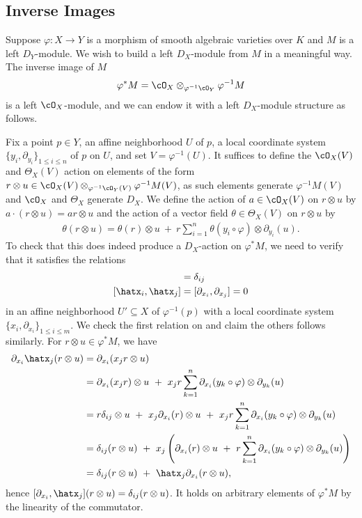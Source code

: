 \subsection{Inverse Images}
Suppose $\varphi:X\to Y$ is a morphism of smooth algebraic varieties over $K$ and $M$ is a left $D_Y$-module. We wish to build a left $D_X$-module from $M$ in a meaningful way. The inverse image of $M$
\begin{align*}
	\varphi^*M = \cO_X \otimes_{\varphi^{-1}\cO_Y} \varphi^{-1}M
\end{align*}
is a left $\cO_X$-module, and we can endow it with a left $D_X$-module structure as follows.

Fix a point $p \in Y$, an affine neighborhood $U$ of $p$, a local coordinate system $\{y_i,\partial_{y_i}\}_{1\leq i\leq n}$ of $p$ on $U$, and set $V = \varphi^{-1}(U)$. It suffices to define the $\cO_X(V)$ and $\Theta_X(V)$ action on elements of the form $r \otimes u \in \cO_X(V) \otimes_{\varphi^{-1}\cO_Y(V)} \varphi^{-1}M(V)$, as such elements generate $\varphi^{-1}M(V)$ and $\cO_X$ and $\Theta_X$ generate $D_X$. We define the action of $a \in \cO_X(V)$ on $r\otimes u$ by $a\cdot (r\otimes u) = ar\otimes u$ and the action of a vector field $\theta \in \Theta_X(V)$ on $r \otimes u$ by
\begin{align*}\label{eqn:inv-img-action}\tag{$\ast$}
	\theta(r \otimes u) = \theta(r)\otimes u ~+~ r\sum_{i=1}^n \theta(y_i \circ \varphi) \otimes \partial_{y_i}(u).
\end{align*}
To check that this does indeed produce a $D_X$-action on $\varphi^*M$, we need to verify that it satisfies the relations
\begin{align*}
	[\partial_{x_i},\hatx_j] &= \delta_{ij} \\
	[\hatx_i,\hatx_j] &= [\partial_{x_i},\partial_{x_j}] = 0
\end{align*}
in an affine neighborhood $U'\subseteq X$ of $\varphi^{-1}(p)$ with a local coordinate system $\{x_i,\partial_{x_i}\}_{1\leq i\leq m}$. We check the first relation on and claim the others follows similarly. For $r\otimes u \in \varphi^*M$, we have
\begin{align*}
	\partial_{x_i}\hatx_j(r\otimes u) 
		&= \partial_{x_i}(x_jr\otimes u) \\
		&= \partial_{x_i}(x_jr) \otimes u ~+~ x_jr\sum_{k=1}^n \partial_{x_i}(y_k \circ \varphi)\otimes \partial_{y_k}(u) \\
		&= r\delta_{ij}\otimes u ~+~ x_j \partial_{x_i}(r)\otimes u ~+~ x_jr\sum_{k=1}^n \partial_{x_i}(y_k \circ \varphi)\otimes \partial_{y_k}(u) \\
		&= \delta_{ij}(r\otimes u) ~+~ x_j\left(\partial_{x_i}(r) \otimes u ~+~ r\sum_{k=1}^n \partial_{x_i}(y_k \circ \varphi)\otimes \partial_{y_k}(u)\right) \\
		&= \delta_{ij}(r\otimes u) ~+~ \hatx_j\partial_{x_i}(r\otimes u),
\end{align*}
hence $[\partial_{x_i}, \hatx_j](r\otimes u) = \delta_{ij}(r\otimes u)$. It holds on arbitrary elements of $\varphi^*M$ by the linearity of the commutator.

